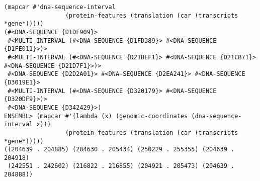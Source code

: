 \documentclass{book}
\begin{document}
\begin{lstlisting}
(mapcar #'dna-sequence-interval
                 (protein-features (translation (car (transcripts *gene*)))))
(#<DNA-SEQUENCE {D1DF909}>
 #<MULTI-INTERVAL (#<DNA-SEQUENCE {D1FD389}> #<DNA-SEQUENCE {D1FE011}>)>
 #<MULTI-INTERVAL (#<DNA-SEQUENCE {D21BEF1}> #<DNA-SEQUENCE {D21CB71}> #<DNA-SEQUENCE {D21D7F1}>)>
 #<DNA-SEQUENCE {D2D2A01}> #<DNA-SEQUENCE {D2EA241}> #<DNA-SEQUENCE {D3019E1}>
 #<MULTI-INTERVAL (#<DNA-SEQUENCE {D320179}> #<DNA-SEQUENCE {D320DF9}>)>
 #<DNA-SEQUENCE {D342429}>)
ENSEMBL> (mapcar #'(lambda (x) (genomic-coordinates (dna-sequence-interval x)))
                 (protein-features (translation (car (transcripts *gene*)))))
((204639 . 204885) (204630 . 205434) (250229 . 255355) (204639 . 204918)
 (242551 . 242602) (216822 . 216855) (204921 . 205473) (204639 . 204888))
\end{lstlisting}
\end{document}
